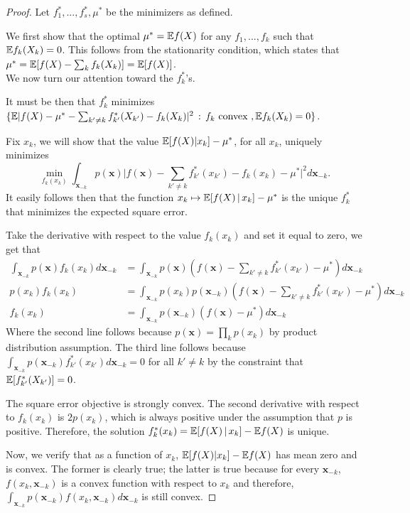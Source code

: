  \begin{proof}
 
Let $f^*_1,...,f^*_s, \mu^*$ be the minimizers as defined. 

We first show that the optimal $\mu^* = {\mathbb E} f(X)$ for any $f_1, ..., f_k$ such that ${\mathbb E} f_k(X_k) = 0$. This follows from the stationarity condition, which states that $\mu^* = {\mathbb E}[ f(X) - \sum_k f_k(X_k)] = {\mathbb E}[ f(X) ]$.\\

We now turn our attention toward the $f^*_k$'s. 

It must be then that $f^*_k$ minimizes $\{ {\mathbb E} | f(X) - \mu^* - \sum_{k' \neq k} f^*_{k'} (X_{k'}) - f_k (X_k)|^2 \,:\, f_k \textrm{ convex }, {\mathbb E} f_k(X_k) = 0 \}$.

Fix $x_k$, we will show that the value ${\mathbb E}[ f(X) | x_k] - \mu^*$, for all $x_k$,  uniquely minimizes 
\[
\min_{ f_k(x_k) } \int_{\mathbf{x}_{-k}} p(\mathbf{x}) 
         \big| f(\mathbf{x}) - \sum_{k' \neq k} f^*_{k'} (x_{k'}) - f_k (x_k) -\mu^*\big|^2 
                 d \mathbf{x}_{-k}.
\]
It easily follows then that the function $x_k \mapsto {\mathbb E}[ f(X) {\,|\,} x_k] - \mu^*$ is the unique $f^*_k$ that minimizes the expected square error.


Take the derivative with respect to the value $f_k(x_k)$ and set it equal to zero, we get that
\begin{align*}
\int_{\mathbf{x}_{-k}} p(\mathbf{x}) f_k(x_k) d \mathbf{x}_{-k} &= 
  \int_{\mathbf{x}_{-k}} p(\mathbf{x}) 
      ( f(\mathbf{x})-\sum_{k' \neq k} f^*_{k'}(x_{k'})-\mu^*) d \mathbf{x}_{-k} \\  
p(x_k) f_k(x_k) &= \int_{\mathbf{x}_{-k}} p(x_k)
     p(\mathbf{x}_{-k}) ( f(\mathbf{x}) - \sum_{k' \neq k} f^*_{k'} (x_{k'})-\mu^*) 
              d \mathbf{x}_{-k} \\
f_k(x_k) &= \int_{\mathbf{x}_{-k}} 
       p(\mathbf{x}_{-k}) (f(\mathbf{x}) -\mu^*) d \mathbf{x}_{-k} 
 \end{align*}
Where the second line follows because $p(\mathbf{x}) = \prod_k p(x_k)$ by product distribution assumption. The third line follows because $\int_{\mathbf{x}_{-k}} p(\mathbf{x}_{-k}) f^*_{k'}(x_{k'}) d\mathbf{x}_{-k} = 0$ for all $k' \neq k$ by the constraint that ${\mathbb E}[f^*_{k'}(X_{k'})] = 0$. 

The square error objective is strongly convex. The second derivative with respect to $f_k(x_k)$ is $2 p(x_k)$, which is always positive under the assumption that $p$ is positive. Therefore, the solution $f^*_k(x_k) = {\mathbb E}[ f(X) {\,|\,} x_k ] - {\mathbb E} f(X)$ is unique.



Now, we verify that as a function of $x_k$, ${\mathbb E}[ f(X) | x_k] - {\mathbb E} f(X)$ has mean zero and is convex. The former is clearly true; the latter is true because for every $\mathbf{x}_{-k}$, $f(x_k, \mathbf{x}_{-k})$ is a convex function with respect to $x_k$ and therefore, $\int_{\mathbf{x}_{-k}} p(\mathbf{x}_{-k}) f(x_k, \mathbf{x}_{-k}) d \mathbf{x}_{-k}$ is still convex. 
 
 \end{proof}
 

